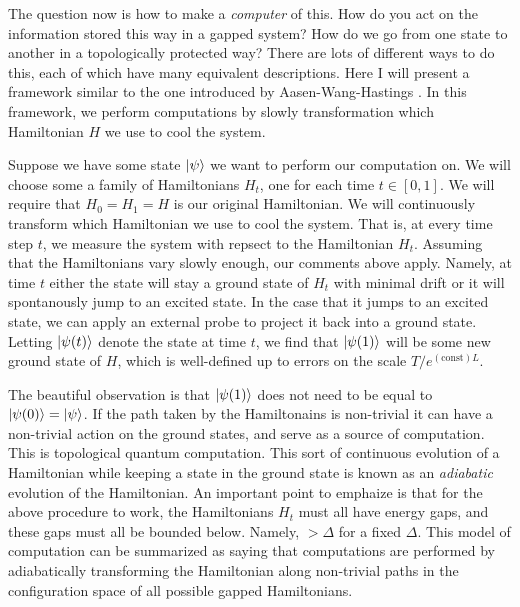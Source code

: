 \documentclass{article}
\theoremstyle{definition}
\numberwithin{figure}{section}
\begin{document}
The question now is how to make a \textit{computer} of this. How do you act on the information stored this way in a gapped system? How do we go from one state to another in a topologically protected way? There are lots of different ways to do this, each of which have many equivalent descriptions. Here I will present a framework similar to the one introduced by Aasen-Wang-Hastings \cite{aasen2022adiabatic}. In this framework, we perform computations by slowly transformation which Hamiltonian $H$ we use to cool the system.

Suppose we have some state $\ket{\psi}$ we want to perform our computation on. We will choose some a family of Hamiltonians $H_t$, one for each time $t\in [0,1]$. We will require that $H_0=H_1=H$ is our original Hamiltonian. We will continuously transform which Hamiltonian we use to cool the system. That is, at every time step $t$, we measure the system with repsect to the Hamiltonian $H_t$. Assuming that the Hamiltonians vary slowly enough, our comments above apply. Namely, at time $t$ either the state will stay a ground state of $H_t$ with minimal drift or it will spontanously jump to an excited state. In the case that it jumps to an excited state, we can apply an external probe to project it back into a ground state. Letting $\ket{\psi(t)}$ denote the state at time $t$, we find that $\ket{\psi(1)}$ will be some new ground state of $H$, which is well-defined up to errors on the scale $T/e^{(\text{const})L}$.

The beautiful observation is that $\ket{\psi(1)}$ does not need to be equal to $\ket{\psi(0)}=\ket{\psi}$. If the path taken by the Hamiltonains is non-trivial it can have a non-trivial action on the ground states, and serve as a source of computation. This is topological quantum computation. This sort of continuous evolution of a Hamiltonian while keeping a state in the ground state is known as an \textit{adiabatic} evolution of the Hamiltonian. An important point to emphaize is that for the above procedure to work, the Hamiltonians $H_t$ must all have energy gaps, and these gaps must all be bounded below. Namely, $>\Delta$ for a fixed $\Delta$. This model of computation can be summarized as saying that computations are performed by adiabatically transforming the Hamiltonian along non-trivial paths in the configuration space of all possible gapped Hamiltonians.
\end{document}
